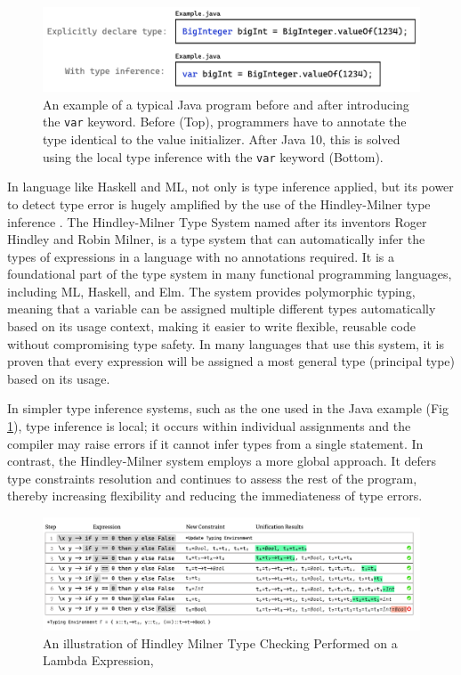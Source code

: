 \begin{figure}[hbt]
  \includegraphics[width=\linewidth]{ExampleJava}
  \caption{
    \label{fig:example-java}
      An example of a typical Java program before and after introducing the \texttt{var} keyword. Before (Top), programmers have to annotate the type identical to the value initializer. After Java 10, this is solved using the local type inference with the \texttt{var} keyword (Bottom).
    }
\end{figure}

In language like Haskell and ML, not only is type inference applied, but its power to detect type error is hugely amplified by the use of the Hindley-Milner type inference  \cite{Damas1982-zw}. The Hindley-Milner Type System  named after its inventors Roger Hindley and Robin Milner, is a type system that can automatically infer the types of expressions in a language with no annotations required. It is a foundational part of the type system in many functional programming languages, including ML, Haskell, and Elm. The system provides polymorphic typing, meaning that a variable can be assigned multiple different types automatically based on its usage context, making it easier to write flexible, reusable code without compromising type safety. In many languages that use this system, it is proven that every expression will be assigned a most general type (principal type) based on its usage. 


In simpler type inference systems, such as the one used in the Java example (Fig \ref{fig:example-java}), type inference is local; it occurs within individual assignments and the compiler may raise errors if it cannot infer types from a single statement. In contrast, the Hindley-Milner system  employs a more global approach. It defers type constraints resolution and continues to assess the rest of the program, thereby increasing flexibility and reducing the immediateness of type errors.




\begin{figure}[hbt]
    \includegraphics[width=\linewidth]{HindleyMilner}
    \caption{
      \label{fig:hindley-milner}
        An illustration of Hindley Milner Type Checking Performed on a Lambda Expression, }
\end{figure}


